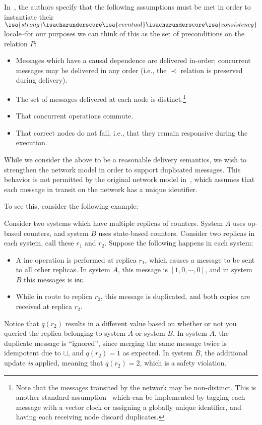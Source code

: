 In~\citep{gomes17}, the authors specify that the following assumptions must be
met in order to instantiate their
$\isa{strong}\isacharunderscore\isa{eventual}\isacharunderscore\isa{consistency}$
locale--for our purposes we can think of this as the set of preconditions on the
relation $P$:
\begin{itemize}
  \item Messages which have a causal dependence are delivered in-order;
    concurrent messages may be delivered in any order (i.e., the $\prec$
    relation is preserved during delivery).
  \item The set of messages delivered at each node is distinct.\footnote{Note
    that the messages transited by the network may be non-distinct. This is
    another standard assumption~\citep{} which can be implemented by tagging
    each message with a vector clock or assigning a globally unique identifier,
    and having each receiving node discard duplicates.}
  \item That concurrent operations commute.
  \item That correct nodes do not fail, i.e., that they remain responsive during
    the execution.
\end{itemize}

While we consider the above to be a reasonable delivery semantics, we wish to
strengthen the network model in order to support duplicated messages. This
behavior is not permitted by the original network model in~\citep{gomes17},
which assumes that each message in transit on the network has a unique
identifier.

To see this, consider the following example:

\begin{example}
  \label{example:state-op-dup-msgs}
  Consider two systems which have multiple replicas of \CRDT counters. System
  $A$ uses op-based counters, and system $B$ uses state-based counters. Consider
  two replicas in each system, call these $r_1$ and $r_2$. Suppose the following
  happens in each system:

  \begin{itemize}
    \item A \textsf{inc} operation is performed at replica $r_1$, which causes a
      message to be sent to all other replicas. In system $A$, this message is
      $[1, 0, \cdots, 0]$, and in system $B$ this messages is $\textsf{inc}$.
    \item While in route to replica $r_2$, this message is duplicated, and both
      copies are received at replica $r_2$.
  \end{itemize}

  Notice that $q(r_2)$ results in a different value based on whether or not you
  queried the replica belonging to system $A$ or system $B$. In system $A$, the
  duplicate message is ``ignored'', since merging the same message twice is
  idempotent due to $\sqcup$, and $q(r_2) = 1$ as expected. In system $B$, the
  additional update \emph{is} applied, meaning that $q(r_2) = 2$, which is a
  safety violation.
\end{example}

